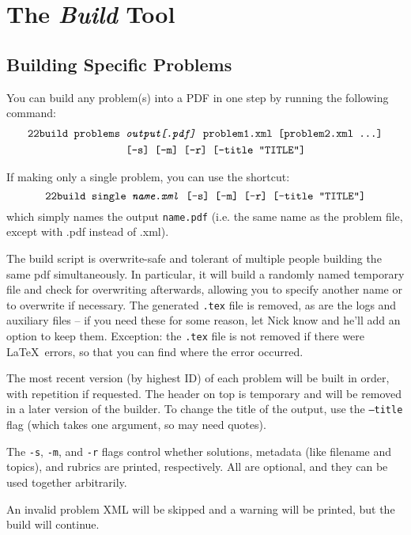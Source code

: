 \section{The \textit{Build} Tool}
  \subsection{Building Specific Problems}
    You can build any problem(s) into a PDF in one step by running the following command:
    \begin{align*}\texttt{22build }\texttt{problems }&\texttt{\textit{output[.pdf]} problem1.xml [problem2.xml \dots]}\\
        ~&\texttt{[-s] [-m] [-r] [--title ``TITLE'']}\end{align*}
        
    If making only a single problem, you can use the shortcut:
    \[\texttt{22build }\texttt{single \textit{name.xml} [-s] [-m] [-r] [--title ``TITLE'']}\]
    which simply names the output \texttt{name.pdf} (i.e. the same name as the problem file, except with .pdf instead of .xml).
    
    The build script is overwrite-safe and tolerant of multiple people building the same pdf simultaneously. In particular, it will build a randomly named temporary file and check for overwriting afterwards, allowing you to specify another name or to overwrite if necessary. The generated \texttt{.tex} file is removed, as are the logs and auxiliary files -- if you need these for some reason, let Nick know and he'll add an option to keep them. Exception: the \texttt{.tex} file is not removed if there were \LaTeX\ errors, so that you can find where the error occurred.
    
    The most recent version (by highest ID) of each problem will be built in order, with repetition if requested. The header on top is temporary and will be removed in a later version of the builder. To change the title of the output, use the \texttt{--title} flag (which takes one argument, so may need quotes).
    
    The \texttt{-s}, \texttt{-m}, and \texttt{-r} flags control whether solutions, metadata (like filename and topics), and rubrics are printed, respectively. All are optional, and they can be used together arbitrarily.
    
    An invalid problem XML will be skipped and a warning will be printed, but the build will continue.
